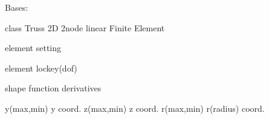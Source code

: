 \documentclass[letterpaper,10pt,english]{sphinxmanual}
\begin{document}
\begin{fulllineitems}
\label{\detokenize{myfempy.felib.struct:myfempy.felib.struct.truss21.Truss21}}
\pysigstartsignatures
{}
\pysigstopsignatures
\sphinxAtStartPar
Bases: 

\sphinxAtStartPar
class Truss 2D 2\sphinxhyphen{}node linear Finite Element

\begin{fulllineitems}
\label{\detokenize{myfempy.felib.struct:myfempy.felib.struct.truss21.Truss21.elemset}}
\pysigstartsignatures
{}
\pysigstopsignatures
\sphinxAtStartPar
element setting

\end{fulllineitems}


\begin{fulllineitems}
\label{\detokenize{myfempy.felib.struct:myfempy.felib.struct.truss21.Truss21.lockey}}
\pysigstartsignatures
{}
\pysigstopsignatures
\sphinxAtStartPar
element lockey(dof)

\end{fulllineitems}


\begin{fulllineitems}
\label{\detokenize{myfempy.felib.struct:myfempy.felib.struct.truss21.Truss21.matrix_b}}
\pysigstartsignatures
{}
\pysigstopsignatures
\sphinxAtStartPar
shape function derivatives
\begin{description}
\sphinxAtStartPar
y(max,min)     \textendash{} y coord.
z(max,min)     \textendash{} z coord.
r(max,min)     \textendash{} r(radius) coord.


\end{description}
\end{fulllineitems}
\end{fulllineitems}
\end{document}
